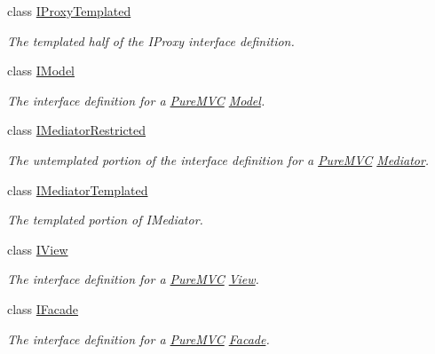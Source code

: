 \begin{DoxyCompactItemize}
class \hyperlink{class_pure_m_v_c_1_1_i_proxy_templated}{IProxyTemplated}
\begin{DoxyCompactList}\small\item\em The templated half of the {\ttfamily IProxy} interface definition. \item\end{DoxyCompactList}\item 
class \hyperlink{class_pure_m_v_c_1_1_i_model}{IModel}
\begin{DoxyCompactList}\small\item\em The interface definition for a \hyperlink{namespace_pure_m_v_c}{PureMVC} \hyperlink{class_pure_m_v_c_1_1_model}{Model}. \item\end{DoxyCompactList}\item 
class \hyperlink{class_pure_m_v_c_1_1_i_mediator_restricted}{IMediatorRestricted}
\begin{DoxyCompactList}\small\item\em The untemplated portion of the interface definition for a \hyperlink{namespace_pure_m_v_c}{PureMVC} \hyperlink{class_pure_m_v_c_1_1_mediator}{Mediator}. \item\end{DoxyCompactList}\item 
class \hyperlink{class_pure_m_v_c_1_1_i_mediator_templated}{IMediatorTemplated}
\begin{DoxyCompactList}\small\item\em The templated portion of IMediator. \item\end{DoxyCompactList}\item 
class \hyperlink{class_pure_m_v_c_1_1_i_view}{IView}
\begin{DoxyCompactList}\small\item\em The interface definition for a \hyperlink{namespace_pure_m_v_c}{PureMVC} \hyperlink{class_pure_m_v_c_1_1_view}{View}. \item\end{DoxyCompactList}\item 
class \hyperlink{class_pure_m_v_c_1_1_i_facade}{IFacade}
\begin{DoxyCompactList}\small\item\em The interface definition for a \hyperlink{namespace_pure_m_v_c}{PureMVC} \hyperlink{class_pure_m_v_c_1_1_facade}{Facade}. \item\end{DoxyCompactList}\item 

\end{DoxyCompactItemize}
